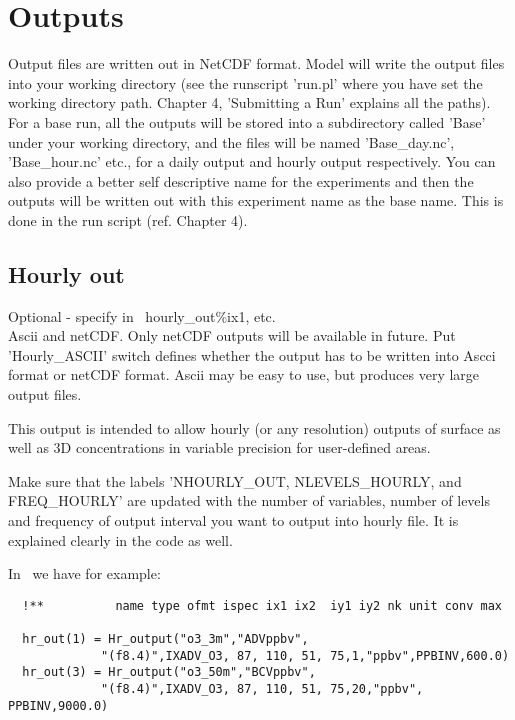 \chapter{Outputs}
\label{OUTPUTS}




Output files are written out in NetCDF format.  
Model will write the output files into your working directory (see the
runscript 'run.pl' where you have set the working directory
path. Chapter 4, 'Submitting a Run' explains all the paths).  For a
base run, all the outputs will be stored into a subdirectory called
'Base' under your working directory, and the files will be named
'Base\_day.nc', 'Base\_hour.nc' etc., for a daily output and hourly
output respectively.  You can also provide a better self descriptive
name for the experiments and then the outputs will be written out with
this experiment name as the base name. This is done in the run
script (ref. Chapter 4).  

\section{Hourly out}

\noindent
Optional -  specify in \MyOutputs\, hourly\_out\%ix1, etc.\\
Ascii and netCDF.  Only netCDF outputs will be available in future. 
Put 'Hourly\_ASCII' switch defines whether the output has to be written
into Ascci format or netCDF format.  Ascii may be easy to use, but
produces very large output files.  

\vspace{1cm}

This output is intended to allow hourly (or any resolution) outputs of surface
as well as 3D concentrations in
variable precision for user-defined areas.  

Make sure that the labels 'NHOURLY\_OUT, NLEVELS\_HOURLY, and FREQ\_HOURLY' are updated with the number of
variables, number of levels and frequency of output interval you want
to output into hourly file.  It is explained clearly in the code as
well.  

 
In \MyOutputs\ we have for example:

\begin{small}
\begin{verbatim}
  !**          name type ofmt ispec ix1 ix2  iy1 iy2 nk unit conv max

  hr_out(1) = Hr_output("o3_3m","ADVppbv", 
             "(f8.4)",IXADV_O3, 87, 110, 51, 75,1,"ppbv",PPBINV,600.0)
  hr_out(3) = Hr_output("o3_50m","BCVppbv",
             "(f8.4)",IXADV_O3, 87, 110, 51, 75,20,"ppbv", PPBINV,9000.0)
\end{verbatim}
\end{small}

